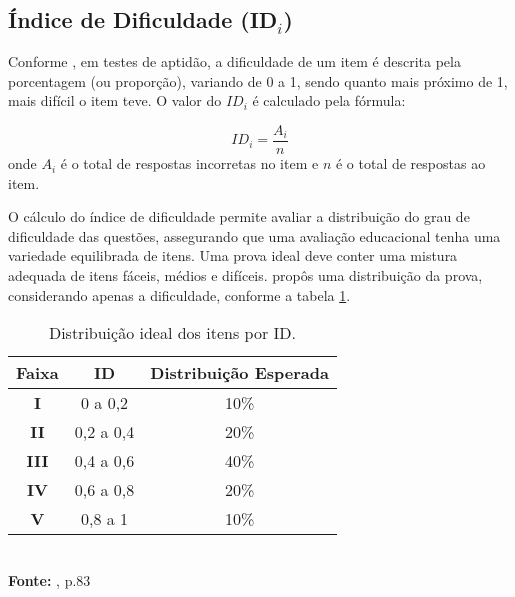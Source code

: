 \subsection{Índice de Dificuldade (ID$_i$)}

Conforme , em testes de aptidão, a dificuldade de um item é descrita pela porcentagem (ou proporção), variando de 0 a 1, sendo quanto mais próximo de 1, mais difícil o item teve. O valor do $ID_i$ é calculado  pela fórmula: 

\[
	ID_i =\dfrac{A_i}{n} 
\]
onde $A_i$ é o total de respostas incorretas no item e $n$ é o total de respostas ao item. 

\begin{comment}
O calculo do índice de dificuldade é importante pois permite conhecer a distribuição do grau de dificuldade das questões que segundo \citeonline{pasquali2003}, para que uma avaliação educacional tenha um nível de dificuldade ideal, os índices devem seguir uma distribuição próxima à curva normal, com itens fáceis, médios e difíceis.
\end{comment}

O cálculo do índice de dificuldade permite avaliar a distribuição do grau de dificuldade das questões, assegurando que uma avaliação educacional tenha uma variedade equilibrada de itens.  Uma prova ideal deve conter uma mistura adequada de itens fáceis, médios e difíceis.  propôs uma distribuição da prova, considerando apenas a dificuldade, conforme a tabela \ref{tabela-class-ID}.


\begin{table}[H]
		\centering
		\caption{Distribuição ideal dos itens por ID.}
		\label{tabela-class-ID}
		\begin{tabular}{ccc}
			\hline
			\textbf{Faixa} & \textbf{ID}  &	  \textbf{Distribuição Esperada}   \\ 
			\hline
			\textbf{I}  & 0 a 0,2 & 10\%   \\ 
			\hline
			\textbf{II} & 0,2 a 0,4 &  20\%   \\
			\hline
			\textbf{III} & 0,4 a 0,6 &  40\%   \\ 
			\hline
			\textbf{IV} & 0,6 a 0,8 &  20\%   \\ 
			\hline
			\textbf{V} & 0,8 a 1 & 10\%   \\ 
			\hline
		\end{tabular}\\
		\vspace*{0.5cm}
		\small{\textbf{Fonte:} , p.83}
\end{table}

